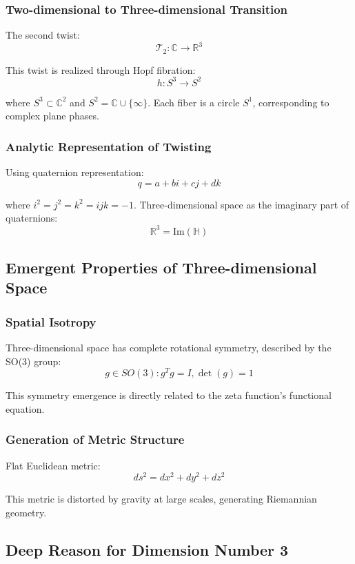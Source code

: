 \documentclass[11pt]{article}
\begin{document}
\subsubsection{Two-dimensional to Three-dimensional Transition}

The second twist:
$$\mathcal{T}_2: \mathbb{C} \to \mathbb{R}^3$$

This twist is realized through Hopf fibration:
$$h: S^3 \to S^2$$

where $S^3 \subset \mathbb{C}^2$ and $S^2 = \mathbb{C} \cup \{\infty\}$. Each fiber is a circle $S^1$, corresponding to complex plane phases.

\subsubsection{Analytic Representation of Twisting}

Using quaternion representation:
$$q = a + bi + cj + dk$$

where $i^2 = j^2 = k^2 = ijk = -1$. Three-dimensional space as the imaginary part of quaternions:
$$\mathbb{R}^3 = \text{Im}(\mathbb{H})$$

\subsection{Emergent Properties of Three-dimensional Space}

\subsubsection{Spatial Isotropy}

Three-dimensional space has complete rotational symmetry, described by the SO(3) group:
$$g \in SO(3): g^T g = I, \det(g) = 1$$

This symmetry emergence is directly related to the zeta function's functional equation.

\subsubsection{Generation of Metric Structure}

Flat Euclidean metric:
$$ds^2 = dx^2 + dy^2 + dz^2$$

This metric is distorted by gravity at large scales, generating Riemannian geometry.

\subsection{Deep Reason for Dimension Number 3}
\end{document}
